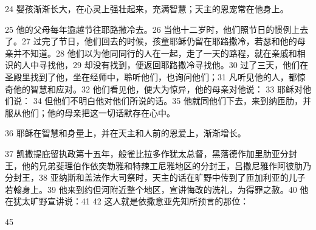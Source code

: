 24  婴孩渐渐长大，在心灵上强壮起来，充满智慧；天主的恩宠常在他身上。\par

25  他的父母每年逾越节往耶路撒冷去。26  当他十二岁时，他们照节日的惯例上去了。27  过完了节日，他们回去的时候，孩童耶稣仍留在耶路撒冷，若瑟和他的母亲并不知道。28  他们以为他同同行的人在一起，走了一天的路程，就在亲戚和相识的人中寻找他，29  却没有找到，便返回耶路撒冷寻找他。30  过了三天，他们在圣殿里找到了他，坐在经师中，聆听他们，也询问他们；31  凡听见他的人，都惊奇他的智慧和应对。32  他们看见他，便大为惊异，他的母亲对他说： 33  耶稣对他们说： 34  但他们不明白他对他们所说的话。35  他就同他们下去，来到纳匝肋，并服从他们；他的母亲把这一切话默存在心中。\par

36  耶稣在智慧和身量上，并在天主和人前的恩爱上，渐渐增长。\par

37  凯撒提庇留执政第十五年，般雀比拉多作犹太总督，黑落德作加里肋亚分封王，他的兄弟斐理伯作依突勒雅和特辣工尼雅地区的分封王，吕撒尼雅作阿彼肋乃分封王，38  亚纳斯和盖法作大司祭时，天主的话在旷野中传到了匝加利亚的儿子若翰身上。39  他来到约但河附近整个地区，宣讲悔改的洗礼，为得罪之赦。40  他在犹太旷野宣讲说：41   42  这人就是依撒意亚先知所预言的那位：\par

\par

45  \par

